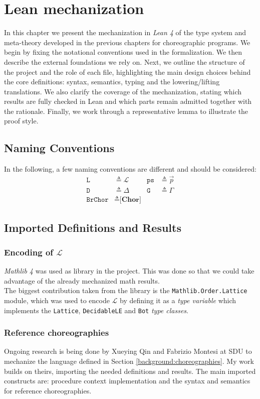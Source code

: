 \documentclass[12pt,a4paper,twoside]{book}
\newcommand{\MCL}{\mathscr{L}}
\begin{document}
\chapter{Lean mechanization}
\noindent
In this chapter we present the mechanization in \emph{Lean 4} of the type system and meta-theory developed in the previous chapters for choreographic programs. We begin by fixing the notational conventions used in the formalization. We then describe the external foundations we rely on. Next, we outline the structure of the project and the role of each file, highlighting the main design choices behind the core definitions: syntax, semantics, typing and the lowering/lifting translations. We also clarify the coverage of the mechanization, stating which results are fully checked in Lean and which parts remain admitted together with the rationale. Finally, we work through a representative lemma to illustrate the proof style.

\label{chap:lean}
\section{Naming Conventions}
In the following, a few naming conventions are different and should be considered:
\begin{align*}
\texttt{L} &\triangleq \MCL &\texttt{ps} &\triangleq \vec{p}\\
\texttt{D} &\triangleq \Delta & \texttt{G} &\triangleq \Gamma\\
\texttt{BrChor} &\triangleq \textbf{[Chor]}
\end{align*}

\section{Imported Definitions and Results}
\label{lean:imports}
\subsection{Encoding of $\MCL$}
\emph{Mathlib 4}\cite{mathlib4} was used as library in the project. This was done so that we could take advantage of the already mechanized math results.\\
The biggest contribution taken from the library is the \texttt{Mathlib.Order.Lattice} module, which was used to encode $\MCL$ by defining it as a \emph{type variable} which implements the \texttt{Lattice}, \texttt{DecidableLE} and \texttt{Bot} \emph{type classes}.
\subsection{Reference choreographies}
Ongoing research is being done by Xueying Qin and Fabrizio Montesi at SDU to mechanize the language defined in Section \ref{background:choreographies}.
My work builds on theirs, importing the needed definitions and results. The main imported constructs are: procedure context implementation and the syntax and semantics for reference choreographies.
\end{document}

